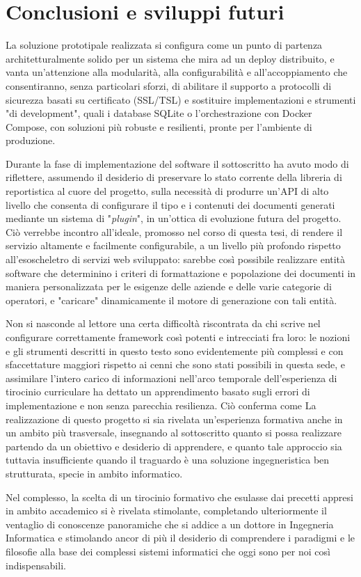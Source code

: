 \chapter{Conclusioni e sviluppi futuri}
La soluzione prototipale realizzata si configura come un punto di partenza architetturalmente solido per un sistema che mira ad un deploy distribuito, e vanta un'attenzione alla modularità, alla configurabilità e all'accoppiamento che consentiranno, senza particolari sforzi, di abilitare il supporto a protocolli di sicurezza basati su certificato (SSL/TSL) e sostituire implementazioni e strumenti "di development", quali i database SQLite o l'orchestrazione con Docker Compose, con soluzioni più robuste e resilienti, pronte per l'ambiente di produzione.

Durante la fase di implementazione del software il sottoscritto ha avuto modo di riflettere, assumendo il desiderio di preservare lo stato corrente della libreria di reportistica al cuore del progetto, sulla necessità di produrre un'API di alto livello che consenta di configurare il tipo e i contenuti dei documenti generati mediante un sistema di "\emph{plugin}", in un'ottica di evoluzione futura del progetto. Ciò verrebbe incontro all'ideale, promosso nel corso di questa tesi, di rendere il servizio altamente e facilmente configurabile, a un livello più profondo rispetto all'esoscheletro di servizi web sviluppato: sarebbe così possibile realizzare entità software che determinino i criteri di formattazione e popolazione dei documenti in maniera personalizzata per le esigenze delle aziende e delle varie categorie di operatori, e "caricare" dinamicamente il motore di generazione con tali entità.

Non si nasconde al lettore una certa difficoltà riscontrata da chi scrive nel configurare correttamente framework così potenti e intrecciati fra loro: le nozioni e gli strumenti descritti in questo testo sono evidentemente più complessi e con sfaccettature maggiori rispetto ai cenni che sono stati possibili in questa sede, e assimilare l'intero carico di informazioni nell'arco temporale dell'esperienza di tirocinio curriculare ha dettato un apprendimento basato sugli errori di implementazione e non senza parecchia resilienza.
Ciò conferma come La realizzazione di questo progetto si sia rivelata un'esperienza formativa anche in un ambito più trasversale, insegnando al sottoscritto quanto si possa realizzare partendo da un obiettivo e desiderio di apprendere, e quanto tale approccio sia tuttavia insufficiente quando il traguardo è una soluzione ingegneristica ben strutturata, specie in ambito informatico.

Nel complesso, la scelta di un tirocinio formativo che esulasse dai precetti appresi in ambito accademico si è rivelata stimolante, completando ulteriormente il ventaglio di conoscenze panoramiche che si addice a un dottore in Ingegneria Informatica e stimolando ancor di più il desiderio di comprendere i paradigmi e le filosofie alla base dei complessi sistemi informatici che oggi sono per noi così indispensabili.